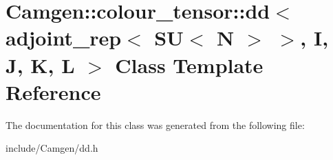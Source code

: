 \hypertarget{a00118}{}\section{Camgen\+:\+:colour\+\_\+tensor\+:\+:dd$<$ adjoint\+\_\+rep$<$ S\+U$<$ N $>$ $>$, I, J, K, L $>$ Class Template Reference}
\label{a00118}


The documentation for this class was generated from the following file\+:\begin{DoxyCompactItemize}
\item 
include/\+Camgen/dd.\+h\end{DoxyCompactItemize}
